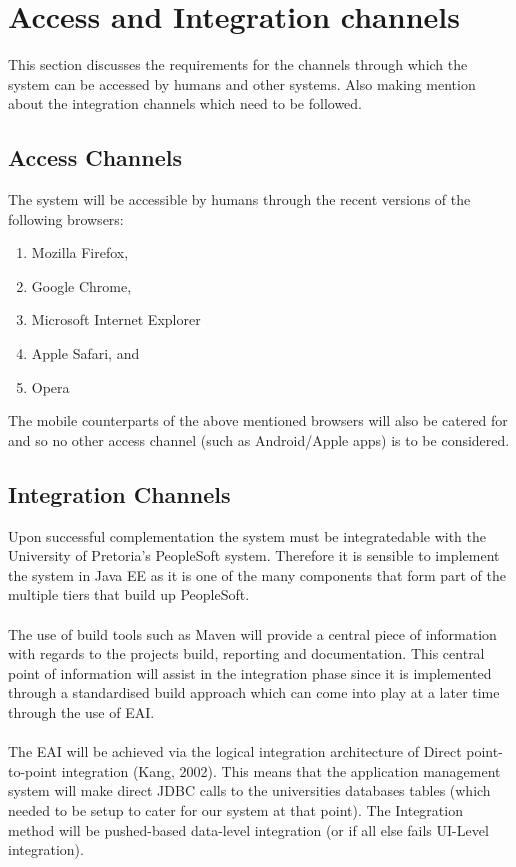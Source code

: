 \documentclass[12pt]{article}
\begin{document}
\section{Access and Integration channels}
This section discusses the requirements for the channels through which the system can be accessed by humans and other systems. Also making mention about the integration channels which need to be followed. 

\subsection{Access Channels}
The system will be accessible by humans through the recent versions of the following browsers:
\begin{enumerate}
\item Mozilla Firefox,
\item Google Chrome,
\item Microsoft Internet Explorer
\item Apple Safari, and
\item Opera
\end{enumerate}
The mobile counterparts of the above mentioned browsers will also be catered for and so no other access channel (such as Android/Apple apps) is to be considered.
\subsection{Integration Channels}
Upon successful complementation the system must be integratedable with the University of Pretoria's PeopleSoft system. Therefore it is sensible to implement the system in Java EE as it is one of the many components that form part of the multiple tiers that build up  PeopleSoft. \\
\\
The use of build tools such as Maven will provide a central piece of information with regards to the projects build, reporting and documentation. This central point of information will assist in the integration phase since it is implemented through a standardised build approach which can come into play at a later time through the use of EAI.\\
\\
The EAI will be achieved via  the logical integration architecture of Direct point-to-point integration (Kang, 2002). This means that the application management system will make direct JDBC calls to the universities databases tables (which needed to be setup to cater for our system at that point). The Integration method will be pushed-based data-level integration (or if all else fails UI-Level integration).
\end{document}
